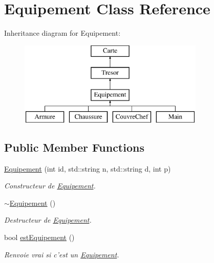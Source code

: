 \hypertarget{class_equipement}{\section{Equipement Class Reference}
\label{class_equipement}
}
Inheritance diagram for Equipement\-:\begin{figure}[H]
\begin{center}
\leavevmode
\includegraphics[height=4.000000cm]{class_equipement}
\end{center}
\end{figure}
\subsection*{Public Member Functions}
\begin{DoxyCompactItemize}
\item 
\hyperlink{class_equipement_a9d04060545423a9da1b0f6ec1b7b79b1}{Equipement} (int id, std\-::string n, std\-::string d, int p)
\begin{DoxyCompactList}\small\item\em Constructeur de \hyperlink{class_equipement}{Equipement}. \end{DoxyCompactList}\item 
\hypertarget{class_equipement_ae7751a52f2665d9e4b3e2cd6929bd986}{\hyperlink{class_equipement_ae7751a52f2665d9e4b3e2cd6929bd986}{$\sim$\-Equipement} ()}\label{class_equipement_ae7751a52f2665d9e4b3e2cd6929bd986}

\begin{DoxyCompactList}\small\item\em Destructeur de \hyperlink{class_equipement}{Equipement}. \end{DoxyCompactList}\item 
bool \hyperlink{class_equipement_ab720166d5e8dd681224de3d9490c106d}{est\-Equipement} ()
\begin{DoxyCompactList}\small\item\em Renvoie vrai si c'est un \hyperlink{class_equipement}{Equipement}. \end{DoxyCompactList}\end{DoxyCompactItemize}
